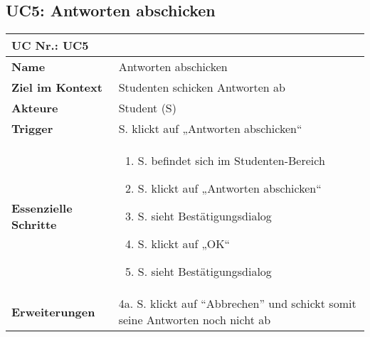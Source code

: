 \begin{table}[h]
\subsection{UC5: Antworten abschicken}
	\begin{tabular}{|p{3cm}|p{11.06cm}|}
	\hline
		\multicolumn{2}{|l|}{\textbf{UC Nr.: UC5} }   \\ \hline
		\textbf{Name}                 &     Antworten abschicken    \\ \hline
		\textbf{Ziel im Kontext}      &     Studenten schicken Antworten ab    \\ \hline
		\textbf{Akteure}              &     Student (S)    \\ \hline
		\textbf{Trigger}              &     S. klickt auf „Antworten abschicken“    \\ \hline
		\textbf{Essenzielle Schritte} & 
			\begin{enumerate}
			  \item S. befindet sich im Studenten-Bereich
			  \item S. klickt auf „Antworten abschicken“
			  \item S. sieht Bestätigungsdialog
			  \item S. klickt auf „OK“
			  \item S. sieht Bestätigungsdialog
			\end{enumerate}
		\\ \hline
		\textbf{Erweiterungen} 		  &   4a. S. klickt auf "`Abbrechen"' und schickt somit seine Antworten noch nicht ab     \\ \hline
	\end{tabular}
\end{table}\FloatBarrier

